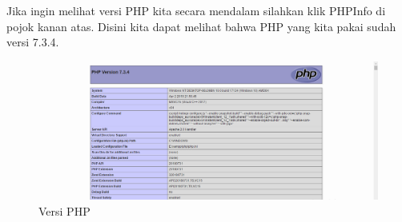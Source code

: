 Jika ingin melihat versi PHP kita secara mendalam silahkan klik PHPInfo di pojok kanan atas. Disini kita dapat melihat bahwa PHP yang kita pakai sudah versi 7.3.4.

\begin{figure}[h]
\centering
\includegraphics[scale=0.4]{figures/versiphp}
\caption{Versi PHP}
\end{figure}

